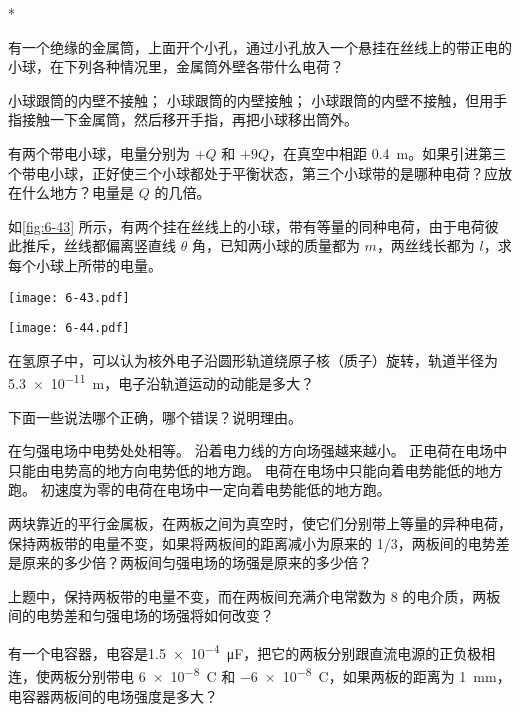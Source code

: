 \begin{Exercise}*
\begin{question}
	\item 有一个绝缘的金属筒，上面开个小孔，通过小孔放入一个悬挂在丝线上的带正电的小球，在下列各种情况里，金属筒外壁各带什么电荷？
	\begin{tasks}
		\task 小球跟筒的内壁不接触；
		\task 小球跟筒的内壁接触；
		\task 小球跟筒的内壁不接触，但用手指接触一下金属筒，然后移开手指，再把小球移出筒外。
	\end{tasks}
	\item 有两个带电小球，电量分别为 $+Q$ 和 $+9Q$，在真空中相距 \qty{0.4}{m}。如果引进第三个带电小球，正好使三个小球都处于平衡状态，第三个小球带的是哪种电荷？应放在什么地方？电量是 $Q$ 的几倍。
	\item 如\cref{fig:6-43} 所示，有两个挂在丝线上的小球，带有等量的同种电荷，由于电荷彼此推斥，丝线都偏离竖直线 $\theta$ 角，已知两小球的质量都为 $m$，两丝线长都为 $l$，求每个小球上所带的电量。
	\begin{figurehere}
	\begin{minipage}[b]{0.48\linewidth}\centering
		\texttt{[image: 6-43.pdf]}
	\caption{}\label{fig:6-43}
	\end{minipage}
	\begin{minipage}[b]{0.48\linewidth}\centering
		\texttt{[image: 6-44.pdf]}
		\caption{}\label{fig:6-44}
	\end{minipage}
	\end{figurehere}
	\item 在氢原子中，可以认为核外电子沿圆形轨道绕原子核（质子）旋转，轨道半径为 \qty{5.3e-11}{m}，电子沿轨道运动的动能是多大？
	\item 下面一些说法哪个正确，哪个错误？说明理由。
	\begin{tasks}
		\task 在匀强电场中电势处处相等。
		\task 沿着电力线的方向场强越来越小。
		\task 正电荷在电场中只能由电势高的地方向电势低的地方跑。
		\task 电荷在电场中只能向着电势能低的地方跑。
		\task 初速度为零的电荷在电场中一定向着电势能低的地方跑。
	\end{tasks}
	\item 两块靠近的平行金属板，在两板之间为真空时，使它们分别带上等量的异种电荷，保持两板带的电量不变，如果将两板间的距离减小为原来的 1/3，两板间的电势差是原来的多少倍？两板间匀强电场的场强是原来的多少倍？
	\item 上题中，保持两板带的电量不变，而在两板间充满介电常数为 8 的电介质，两板间的电势差和匀强电场的场强将如何改变？
	\item 有一个电容器，电容是\qty{1.5e-4}{\micro F}，把它的两板分别跟直流电源的正负极相连，使两板分别带电 \qty{+6e-8}{C} 和 \qty{-6e-8}{C}，如果两板的距离为 \qty{1}{mm}，电容器两板间的电场强度是多大？

\end{question}
\end{Exercise}
